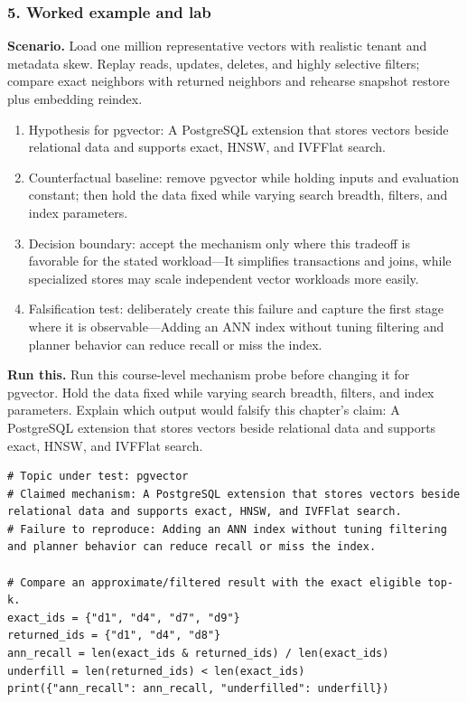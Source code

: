 \subsubsection*{5. Worked example and lab}
\textbf{Scenario.} Load one million representative vectors with realistic tenant and metadata skew. Replay reads, updates, deletes, and highly selective filters; compare exact neighbors with returned neighbors and rehearse snapshot restore plus embedding reindex.
\begin{enumerate}
\item Hypothesis for pgvector: A PostgreSQL extension that stores vectors beside relational data and supports exact, HNSW, and IVFFlat search.
\item Counterfactual baseline: remove pgvector while holding inputs and evaluation constant; then hold the data fixed while varying search breadth, filters, and index parameters.
\item Decision boundary: accept the mechanism only where this tradeoff is favorable for the stated workload—It simplifies transactions and joins, while specialized stores may scale independent vector workloads more easily.
\item Falsification test: deliberately create this failure and capture the first stage where it is observable—Adding an ANN index without tuning filtering and planner behavior can reduce recall or miss the index.
\end{enumerate}
\textbf{Run this.} Run this course-level mechanism probe before changing it for pgvector. Hold the data fixed while varying search breadth, filters, and index parameters. Explain which output would falsify this chapter's claim: A PostgreSQL extension that stores vectors beside relational data and supports exact, HNSW, and IVFFlat search.
\begin{Verbatim}[fontsize=\scriptsize]
# Topic under test: pgvector
# Claimed mechanism: A PostgreSQL extension that stores vectors beside relational data and supports exact, HNSW, and IVFFlat search.
# Failure to reproduce: Adding an ANN index without tuning filtering and planner behavior can reduce recall or miss the index.

# Compare an approximate/filtered result with the exact eligible top-k.
exact_ids = {"d1", "d4", "d7", "d9"}
returned_ids = {"d1", "d4", "d8"}
ann_recall = len(exact_ids & returned_ids) / len(exact_ids)
underfill = len(returned_ids) < len(exact_ids)
print({"ann_recall": ann_recall, "underfilled": underfill})
\end{Verbatim}
